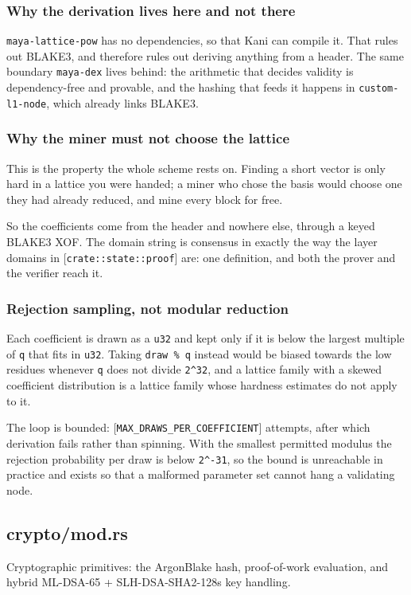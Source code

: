 \documentclass[11pt,a4paper]{article}
\begin{document}
\subsubsection{Why the derivation lives here and not there}

\texttt{maya-lattice-pow} has no dependencies, so that Kani can compile it. That
rules out BLAKE3, and therefore rules out deriving anything from a header.
The same boundary \texttt{maya-dex} lives behind: the arithmetic that decides
validity is dependency-free and provable, and the hashing that feeds it
happens in \texttt{custom-l1-node}, which already links BLAKE3.

\subsubsection{Why the miner must not choose the lattice}

This is the property the whole scheme rests on. Finding a short vector is
only hard in a lattice you were handed; a miner who chose the basis would
choose one they had already reduced, and mine every block for free.

So the coefficients come from the header and nowhere else, through a keyed
BLAKE3 XOF. The domain string is consensus in exactly the way the layer
domains in [\texttt{crate::state::proof}] are: one definition, and both the prover
and the verifier reach it.

\subsubsection{Rejection sampling, not modular reduction}

Each coefficient is drawn as a \texttt{u32} and kept only if it is below the
largest multiple of \texttt{q} that fits in \texttt{u32}. Taking \texttt{draw \% q} instead would
be biased towards the low residues whenever \texttt{q} does not divide \texttt{2\textasciicircum{}32}, and
a lattice family with a skewed coefficient distribution is a lattice family
whose hardness estimates do not apply to it.

The loop is bounded: [\texttt{MAX\_DRAWS\_PER\_COEFFICIENT}] attempts, after which
derivation fails rather than spinning. With the smallest permitted modulus
the rejection probability per draw is below \texttt{2\textasciicircum{}-31}, so the bound is
unreachable in practice and exists so that a malformed parameter set cannot
hang a validating node.

\subsection{crypto/mod.rs}
Cryptographic primitives: the ArgonBlake hash, proof-of-work evaluation,
and hybrid ML-DSA-65 + SLH-DSA-SHA2-128s key handling.
\end{document}
